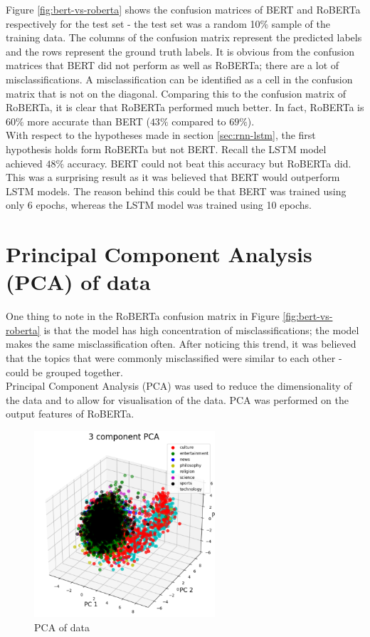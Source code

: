 Figure \ref{fig:bert-vs-roberta} shows the confusion matrices of BERT and RoBERTa respectively for the test set - the test set was a
random 10\% sample of the training data. The columns of the confusion matrix represent the predicted labels and the rows represent the
ground truth labels. It is obvious from the confusion matrices that BERT did not perform as well as RoBERTa; there are a lot of
misclassifications. A misclassification can be identified as a cell in the confusion matrix that is not on the diagonal. Comparing this
to the confusion matrix of RoBERTa, it is clear that RoBERTa performed much better. In fact, RoBERTa is $60\%$ more accurate than BERT
($43\%$ compared to $69\%$).\\
With respect to the hypotheses made in section \ref{sec:rnn-lstm}, the first hypothesis holds form RoBERTa but not BERT. Recall the LSTM
model achieved $48\%$ accuracy. BERT could not beat this accuracy but RoBERTa did. This was a surprising result as it was believed
that BERT would outperform LSTM models. The reason behind this could be that BERT was trained using only 6 epochs, whereas the LSTM model
was trained using 10 epochs.
\section{Principal Component Analysis (PCA) of data}
One thing to note in the RoBERTa confusion matrix in Figure \ref{fig:bert-vs-roberta} is that the model has high concentration
of misclassifications; the model makes the same misclassification often. After noticing this trend, it was believed that the topics
that were commonly misclassified were similar to each other - could be grouped together.\\
Principal Component Analysis (PCA) was used to reduce the dimensionality of the data and to allow for visualisation of the data. PCA
was performed on the output features of RoBERTa.
\begin{figure}
    \centering
    \includegraphics[width=0.6\textwidth]{../images/pca.png}
    \caption{PCA of data}
    \label{fig:pca}
\end{figure}

